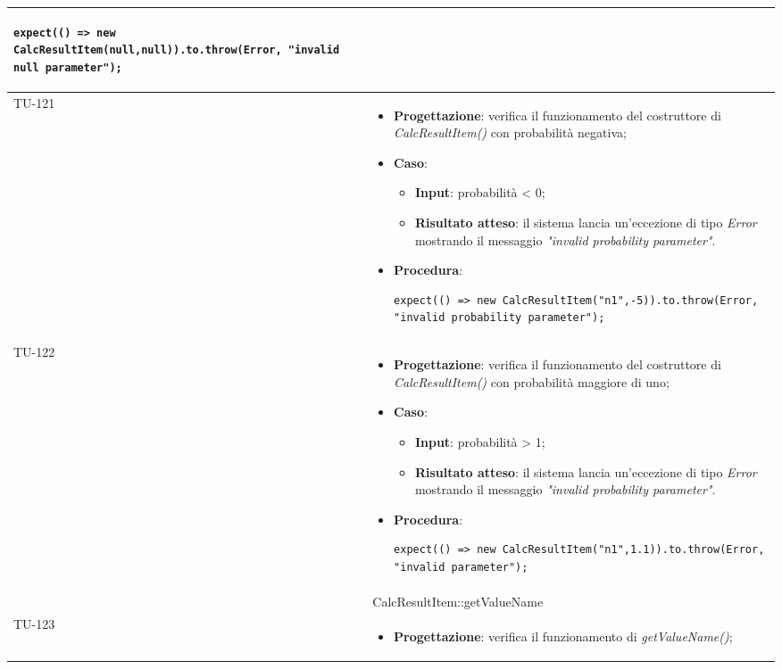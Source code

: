 \begin{longtable}{|C{1.5cm}|C{14.5cm}|}
\begin{itemize}
	\begin{lstlisting}
expect(() => new CalcResultItem(null,null)).to.throw(Error, "invalid null parameter");
	\end{lstlisting}
\end{itemize}\\
\hline
{TU-121} &
\begin{itemize}
	\item \textbf{Progettazione}: verifica il funzionamento del costruttore di \emph{CalcResultItem()} con probabilità negativa;
	\item \textbf{Caso}: 
	\begin{itemize}
		\item \textbf{Input}: probabilità < 0;
		\item \textbf{Risultato atteso}: il sistema lancia un'eccezione di tipo \emph{Error} mostrando il messaggio \emph{"invalid probability parameter"}.
	\end{itemize}
	\item \textbf{Procedura}:
	\begin{lstlisting}
expect(() => new CalcResultItem("n1",-5)).to.throw(Error, "invalid probability parameter");
	\end{lstlisting}
\end{itemize}\\
\hline
{TU-122} &
\begin{itemize}
	\item \textbf{Progettazione}: verifica il funzionamento del costruttore di \emph{CalcResultItem()} con probabilità maggiore di uno;
	\item \textbf{Caso}: 
	\begin{itemize}
		\item \textbf{Input}: probabilità > 1;
		\item \textbf{Risultato atteso}: il sistema lancia un'eccezione di tipo \emph{Error} mostrando il messaggio \emph{"invalid probability parameter"}.
	\end{itemize}
	\item \textbf{Procedura}:
	\begin{lstlisting}
expect(() => new CalcResultItem("n1",1.1)).to.throw(Error, "invalid parameter");
	\end{lstlisting}
\end{itemize}\\
\hline
{} & CalcResultItem::getValueName
\\ \hline
{TU-123} &
\begin{itemize}
	\item \textbf{Progettazione}: verifica il funzionamento di \emph{getValueName()};

\end{itemize}
\end{longtable}
